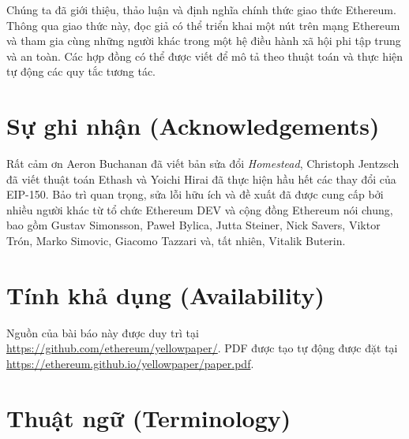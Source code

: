 \documentclass[9pt,oneside]{amsart}
\begin{document}
\begin{multicols}{2}
Chúng ta đã giới thiệu, thảo luận và định nghĩa chính thức giao thức Ethereum. Thông qua giao thức này, đọc giả có thể triển khai một nút trên mạng Ethereum và tham gia cùng những người khác trong một hệ điều hành xã hội phi tập trung và an toàn. Các hợp đồng có thể được viết để mô tả theo thuật toán và thực hiện tự động các quy tắc tương tác.

\section{Sự ghi nhận (Acknowledgements)}

Rất cảm ơn Aeron Buchanan đã viết bản sửa đổi \textit{Homestead}, Christoph Jentzsch đã viết thuật toán Ethash và Yoichi Hirai đã thực hiện hầu hết các thay đổi của EIP-150. Bảo trì quan trọng, sửa lỗi hữu ích và đề xuất đã được cung cấp bởi nhiều người khác từ tổ chức Ethereum DEV và cộng đồng Ethereum nói chung, bao gồm Gustav Simonsson, Pawe\l{} Bylica, Jutta Steiner, Nick Savers, Viktor Tr\'{o}n, Marko Simovic, Giacomo Tazzari và, tất nhiên, Vitalik Buterin.

\section{Tính khả dụng (Availability)}

Nguồn của bài báo này được duy trì tại \url{https://github.com/ethereum/yellowpaper/}. PDF được tạo tự động được đặt tại \url{https://ethereum.github.io/yellowpaper/paper.pdf}.




\end{multicols}

\appendix

\section{Thuật ngữ (Terminology)} \label{ch:Terminology}
\end{document}

